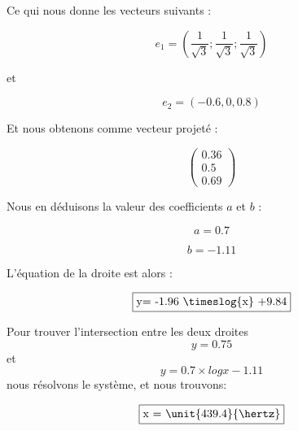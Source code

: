 \documentclass{article}
\begin{document}
Ce qui nous donne les vecteurs suivants :

$$e_1=( \frac{1}{\sqrt{3}} ; \frac{1}{\sqrt{3}} ; \frac{1}{\sqrt{3}})$$

et

$$e_2=( -0.6, 0, 0.8)$$

Et nous obtenons comme vecteur projeté :

$$
\begin{pmatrix}  
	0.36\\
	0.5\\
	0.69
\end{pmatrix}
$$

Nous en déduisons la valeur des coefficients $a$ et $b$ :  

$$a =0.7$$

$$b= -1.11$$

L'équation de la droite est alors :

$$\fbox{y= -1.96 \timeslog{x} +9.84}$$

Pour trouver l'intersection entre les deux droites $$y=0.75$$ et $$y= 0.7 \times log{x} -1.11$$ nous résolvons le système, et nous trouvons: 

$$\fbox{x = \unit{439.4}{\hertz}}$$ 
\end{document}
